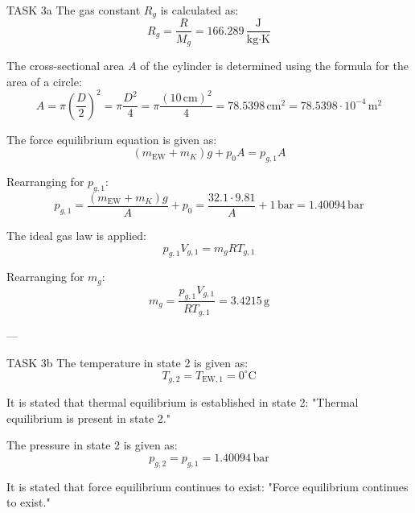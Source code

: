 TASK 3a  
The gas constant \( R_g \) is calculated as:  
\[
R_g = \frac{R}{M_g} = 166.289 \, \frac{\text{J}}{\text{kg·K}}
\]

The cross-sectional area \( A \) of the cylinder is determined using the formula for the area of a circle:  
\[
A = \pi \left(\frac{D}{2}\right)^2 = \pi \frac{D^2}{4} = \pi \frac{(10 \, \text{cm})^2}{4} = 78.5398 \, \text{cm}^2 = 78.5398 \cdot 10^{-4} \, \text{m}^2
\]

The force equilibrium equation is given as:  
\[
(m_{\text{EW}} + m_K) g + p_0 A = p_{g,1} A
\]

Rearranging for \( p_{g,1} \):  
\[
p_{g,1} = \frac{(m_{\text{EW}} + m_K) g}{A} + p_0 = \frac{32.1 \cdot 9.81}{A} + 1 \, \text{bar} = 1.40094 \, \text{bar}
\]

The ideal gas law is applied:  
\[
p_{g,1} V_{g,1} = m_g R T_{g,1}
\]

Rearranging for \( m_g \):  
\[
m_g = \frac{p_{g,1} V_{g,1}}{R T_{g,1}} = 3.4215 \, \text{g}
\]

---

TASK 3b  
The temperature in state 2 is given as:  
\[
T_{g,2} = T_{\text{EW},1} = 0^\circ\text{C}
\]

It is stated that thermal equilibrium is established in state 2:  
"Thermal equilibrium is present in state 2."

The pressure in state 2 is given as:  
\[
p_{g,2} = p_{g,1} = 1.40094 \, \text{bar}
\]

It is stated that force equilibrium continues to exist:  
"Force equilibrium continues to exist."